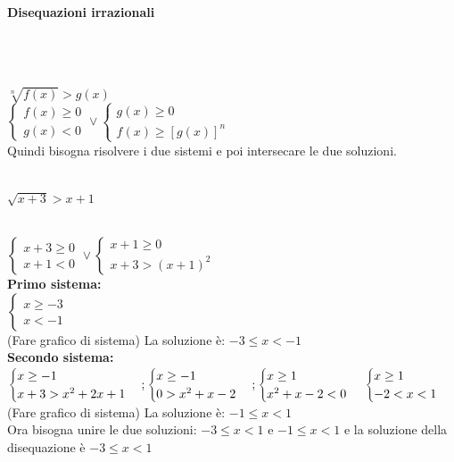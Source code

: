 \documentclass[12pt]{report}
\newcounter{exercise}
\begin{document}
	\paragraph{Disequazioni irrazionali} \quad \\
	\begin{note}{}{} \quad \\
		$\sqrt[n]{f(x)} > g(x)$ \\
		$\begin{cases}
			f(x) \geq 0 \\
			g(x) < 0
		\end{cases} \vee \begin{cases}
			g(x) \geq 0 \\
			f(x) \geq [g(x)]^n
		\end{cases}$ \\
		Quindi bisogna risolvere i due sistemi e poi intersecare le due soluzioni.
	\end{note}
	\begin{assignment}{}{} \quad \\
		$\sqrt{x + 3} > x + 1$
		\begin{exercise}{}{} \quad \\
			$\begin{cases}
				x+3\geq 0 \\
				x + 1 < 0
			\end{cases} \vee \begin{cases}
				x + 1 \geq 0 \\
				x+3 > (x+1)^2
			\end{cases}$ \\
			\textbf{Primo sistema:} \\
			$\begin{cases}
				x \geq -3 \\
				x < -1
			\end{cases}
			$ \\
			(Fare grafico di sistema) La soluzione è: $-3 \leq x < -1$ \\
			\textbf{Secondo sistema:} \\
			$\begin{cases}
				x \geq -1 \\
				x + 3 > x^2 + 2x + 1
			\end{cases}; \begin{cases}
				x \geq -1 \\
				0 > x^2 + x - 2
			\end{cases} ; \begin{cases}
				x \geq 1 \\
				x^2 + x - 2 < 0
			\end{cases} \\ \begin{cases}
				x \geq 1 \\
				-2 < x < 1
			\end{cases}$ \\
			(Fare grafico di sistema) La soluzione è: $-1 \leq x < 1$ \\
			Ora bisogna unire le due soluzioni: $-3 \leq x < 1$ e $-1 \leq x < 1$ e la soluzione della disequazione è $-3 \leq x < 1$
		\end{exercise}
	\end{assignment}
\end{document}
